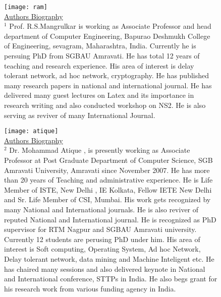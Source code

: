 \documentclass[3p,times]{elsarticle}
\begin{document}


\begin{figure}[h!]
\mbox{\texttt{[image: ram]}}
\\ \underline{Authors Biography} \\  $^1$ Prof. R.S.Mangrulkar is working as Associate Professor and head department of Computer Engineering, Bapurao Deshmukh College of Engineering, sevagram, Maharashtra, India. Currently he is persuing PhD  from SGBAU Amravati. He has total 12 years of teaching and research experience.  His area of interest is delay tolerant network, ad hoc network, cryptography.  He has published many research papers in national and international journal. He has delivered many guest lectures on Latex and its importance in research  writing and also conducted workshop on NS2. He is also serving as reviver of many International Journal.
\end{figure}
\begin{figure}[h!]
\mbox{\texttt{[image: atique]}}
\\ \underline{Authors Biography} \\  $^2$ Dr. Mohammad Atique , is presently working as Associate Professor at Post Graduate Department of Computer Science, SGB Amravati University, Amravati since November 2007. He has more than 20 years of Teaching and administrative experience. He is Life Member of ISTE, New Delhi , IE Kolkata, Fellow IETE New Delhi and Sr. Life Member of CSI, Mumbai. His work gets recognized by many National and International journals. He is also reviver of reputed National and International journal. He is recognized as PhD supervisor for RTM Nagpur and SGBAU Amravati university. Currently 12 students are perusing PhD under him. His area of interest is Soft computing, Operating System, Ad hoc Network, Delay tolerant network, data mining and Machine Inteligent etc. He has chaired many sessions and also delivered keynote in National and International conference, STTPs in India. He also begs grant for his research work from various funding agency in India.                        

\end{figure}
\end{document}
